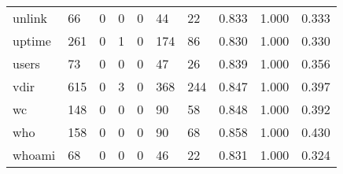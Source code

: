\begin{longtable}{lp{2.0cm}p{2.0cm}p{2.0cm}p{2.0cm}p{2.0cm}p{2.0cm}p{2.0cm}p{2.0cm}p{2.0cm}}
unlink    &                     66 &                                             0 &                                            0 &                                           0 &                                           44 &                                         22 &                                0.833 &                                  1.000 &                                0.333 \\
uptime    &                    261 &                                             0 &                                            1 &                                           0 &                                          174 &                                         86 &                                0.830 &                                  1.000 &                                0.330 \\
users     &                     73 &                                             0 &                                            0 &                                           0 &                                           47 &                                         26 &                                0.839 &                                  1.000 &                                0.356 \\
vdir      &                    615 &                                             0 &                                            3 &                                           0 &                                          368 &                                        244 &                                0.847 &                                  1.000 &                                0.397 \\
wc        &                    148 &                                             0 &                                            0 &                                           0 &                                           90 &                                         58 &                                0.848 &                                  1.000 &                                0.392 \\
who       &                    158 &                                             0 &                                            0 &                                           0 &                                           90 &                                         68 &                                0.858 &                                  1.000 &                                0.430 \\
whoami    &                     68 &                                             0 &                                            0 &                                           0 &                                           46 &                                         22 &                                0.831 &                                  1.000 &                                0.324 \\

\end{longtable}
